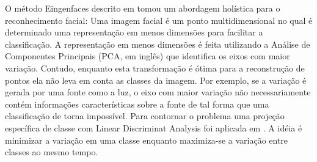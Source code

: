 O método Eingenfaces descrito em \cite{eigenfaces} tomou um abordagem holística para o reconhecimento facial: Uma imagem facial é um ponto multidimensional no qual é determinado uma representação em menos dimensões para facilitar a classificação. A representação em menos dimensões é feita utilizando a Análise de Componentes Principais (PCA, em inglês) que identifica os eixos com maior variação. Contudo, enquanto esta transformação é ótima para a reconstrução de pontos ela não leva em conta as classes da imagem. Por exemplo, se a variação é gerada por uma fonte como a luz, o eixo com maior variação não necessariamente contém informações características sobre a fonte de tal forma que uma classificação de torna impossível. Para contornar o problema uma projeção específica de classe com Linear Discriminat Analysis foi aplicada em \cite{fisherfaces}. A idéia é minimizar a variação em uma classe enquanto maximiza-se a variação entre classes ao mesmo tempo.

